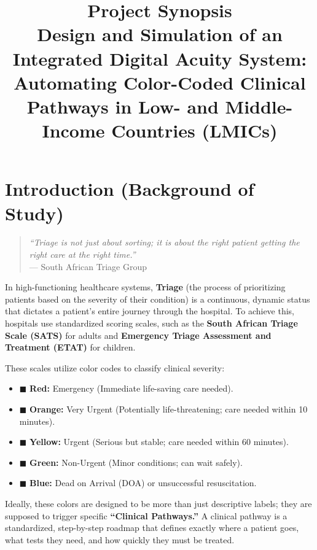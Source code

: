 \documentclass[12pt, a4paper]{article}
\title{\textbf{Project Synopsis}\\\Large Design and Simulation of an Integrated Digital Acuity System: Automating Color-Coded Clinical Pathways in Low- and Middle-Income Countries (LMICs)}
\author{}
\date{}
\begin{document}
	
	\maketitle
	\vspace{-1.5cm} %
	
	\section{Introduction (Background of Study)}
	\begin{quote}
		\textit{``Triage is not just about sorting; it is about the right patient getting the right care at the right time.''} \\
		--- South African Triage Group
	\end{quote}
	
	In high-functioning healthcare systems, \textbf{Triage} (the process of prioritizing patients based on the severity of their condition) is a continuous, dynamic status that dictates a patient's entire journey through the hospital. To achieve this, hospitals use standardized scoring scales, such as the \textbf{South African Triage Scale (SATS)} for adults and \textbf{Emergency Triage Assessment and Treatment (ETAT)} for children. 
	
	These scales utilize color codes to classify clinical severity:
	\begin{itemize}[label={}, leftmargin=1.5em]
		\item \textcolor{triageRed}{$\blacksquare$} \textbf{Red:} Emergency (Immediate life-saving care needed).
		\item \textcolor{triageOrange}{$\blacksquare$} \textbf{Orange:} Very Urgent (Potentially life-threatening; care needed within 10 minutes).
		\item \textcolor{triageYellow}{$\blacksquare$} \textbf{Yellow:} Urgent (Serious but stable; care needed within 60 minutes).
		\item \textcolor{triageGreen}{$\blacksquare$} \textbf{Green:} Non-Urgent (Minor conditions; can wait safely).
		\item \textcolor{triageBlue}{$\blacksquare$} \textbf{Blue:} Dead on Arrival (DOA) or unsuccessful resuscitation.
	\end{itemize}
	
	Ideally, these colors are designed to be more than just descriptive labels; they are supposed to trigger specific \textbf{``Clinical Pathways.''} A clinical pathway is a standardized, step-by-step roadmap that defines exactly where a patient goes, what tests they need, and how quickly they must be treated. 
	
\end{document}
